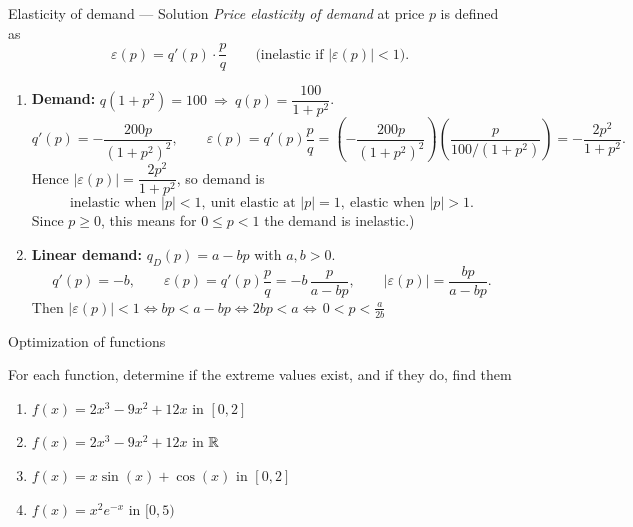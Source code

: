 \documentclass[9pt]{beamer}
\begin{document}
\begin{frame}{Elasticity of demand — Solution}
\footnotesize
\emph{Price elasticity of demand} at price $p$ is defined as
\[
\varepsilon(p)=q'(p)\cdot\frac{p}{q}\qquad
\text{(inelastic if }|\varepsilon(p)|<1\text{)}.
\]

\begin{enumerate}[leftmargin=0.5cm, label=\arabic*., rightmargin=0.2cm]
  \item \textbf{Demand: } $q(1+p^2)=100\ \Rightarrow\ q(p)=\dfrac{100}{1+p^2}$.
  \[
    q'(p)=-\frac{200p}{(1+p^2)^2},
    \qquad
    \varepsilon(p)=q'(p)\frac{p}{q}
      =\left(-\frac{200p}{(1+p^2)^2}\right)\!\left(\frac{p}{100/(1+p^2)}\right)
      =-\frac{2p^2}{1+p^2}.
  \]
  Hence $|\varepsilon(p)|=\dfrac{2p^2}{1+p^2}$, so demand is
  \[
    \text{inelastic when }|p|<1,\ \text{unit elastic at }|p|=1,\ \text{elastic when }|p|>1.
  \]
  Since $p\ge0$, this means for $0\le p<1$ the demand is inelastic.)

  \item \textbf{Linear demand: } $q_D(p)=a-bp$ with $a,b>0$.
  \[
    q'(p)=-b,\qquad
    \varepsilon(p)=q'(p)\frac{p}{q}
      =-b\,\frac{p}{a-bp},\qquad
    |\varepsilon(p)|=\frac{bp}{a-bp}.
  \]
  Then $|\varepsilon(p)|<1\iff bp<a-bp\iff 2bp<a\iff \boxed{\,0<p<\frac{a}{2b}\,}$
\end{enumerate}
\end{frame}


\begin{frame}{Optimization of functions}

For each function, determine if the extreme values exist, and if they do, find them

\begin{enumerate}[leftmargin = 0.5cm, label = (\alph*), rightmargin = 0.2cm]

    \item $f(x) = 2x^3 - 9x^2 + 12x$ in $[0, 2]$

    \item $f(x) = 2x^3 - 9x^2 + 12x$ in $\mathbb{R}$

    \item $f(x) = x\sin(x) + \cos(x)$ in $[0, 2]$

    \item $f(x) = x^2e^{-x}$ in $[0, 5)$
    
\end{enumerate}
    
\end{frame}
\end{document}

